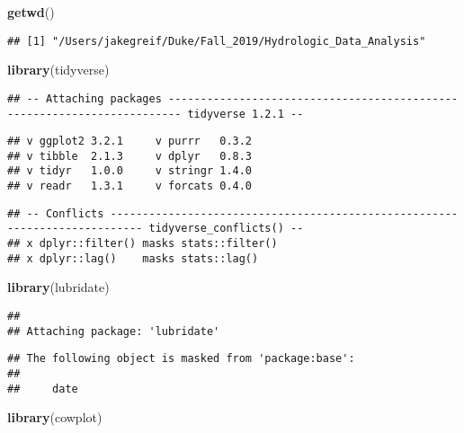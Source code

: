 \documentclass[]{article}
\newenvironment{Shaded}{\begin{snugshade}}{\end{snugshade}}
\newcommand{\KeywordTok}[1]{\textcolor[rgb]{0.13,0.29,0.53}{\textbf{#1}}}
\newcommand{\NormalTok}[1]{#1}
\begin{document}
\begin{Shaded}
\begin{Highlighting}[]
\KeywordTok{getwd}\NormalTok{()}
\end{Highlighting}
\end{Shaded}

\begin{verbatim}
## [1] "/Users/jakegreif/Duke/Fall_2019/Hydrologic_Data_Analysis"
\end{verbatim}

\begin{Shaded}
\begin{Highlighting}[]
\KeywordTok{library}\NormalTok{(tidyverse)}
\end{Highlighting}
\end{Shaded}

\begin{verbatim}
## -- Attaching packages ------------------------------------------------------------------------ tidyverse 1.2.1 --
\end{verbatim}

\begin{verbatim}
## v ggplot2 3.2.1     v purrr   0.3.2
## v tibble  2.1.3     v dplyr   0.8.3
## v tidyr   1.0.0     v stringr 1.4.0
## v readr   1.3.1     v forcats 0.4.0
\end{verbatim}

\begin{verbatim}
## -- Conflicts --------------------------------------------------------------------------- tidyverse_conflicts() --
## x dplyr::filter() masks stats::filter()
## x dplyr::lag()    masks stats::lag()
\end{verbatim}

\begin{Shaded}
\begin{Highlighting}[]
\KeywordTok{library}\NormalTok{(lubridate)}
\end{Highlighting}
\end{Shaded}

\begin{verbatim}
## 
## Attaching package: 'lubridate'
\end{verbatim}

\begin{verbatim}
## The following object is masked from 'package:base':
## 
##     date
\end{verbatim}

\begin{Shaded}
\begin{Highlighting}[]
\KeywordTok{library}\NormalTok{(cowplot)}
\end{Highlighting}
\end{Shaded}
\end{document}
